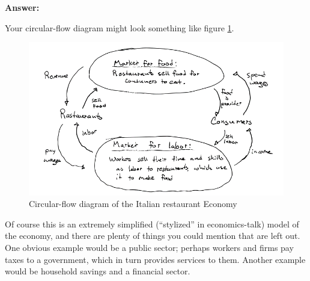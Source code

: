 \documentclass[12pt]{article}
\begin{document}
\textbf{Answer:}

Your circular-flow diagram might look something like figure \ref{fig:CFD}.

\begin{figure}
    \centering
    \includegraphics[width=\textwidth]{CFD.png}
    \caption{Circular-flow diagram of the Italian restaurant Economy}
    \label{fig:CFD}
\end{figure}

Of course this is an extremely simplified (``stylized'' in economics-talk) model of the economy, and there are plenty of things you could mention that are left out. One obvious example would be a public sector; perhaps workers and firms pay taxes to a government, which in turn provides services to them. Another example would be household savings and a financial sector.
\end{document}
